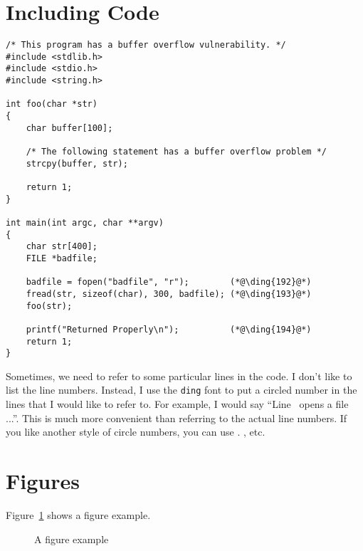\section{Including Code}



\begin{lstlisting}[caption={The vulnerable program (\texttt{stack.c})},
                   label={buffer:stack_program}]
/* This program has a buffer overflow vulnerability. */
#include <stdlib.h>
#include <stdio.h>
#include <string.h>

int foo(char *str)
{
    char buffer[100];

    /* The following statement has a buffer overflow problem */
    strcpy(buffer, str);

    return 1;
}

int main(int argc, char **argv)
{
    char str[400];
    FILE *badfile;

    badfile = fopen("badfile", "r");        (*@\ding{192}@*)
    fread(str, sizeof(char), 300, badfile); (*@\ding{193}@*)
    foo(str);

    printf("Returned Properly\n");          (*@\ding{194}@*)
    return 1;
}
\end{lstlisting}
 

Sometimes, we need to refer to some particular lines in the code. I don't like to list 
the line numbers. Instead, I use the \texttt{ding} font to 
put a circled number in the lines that I would like to refer to. 
For example, I would say ``Line~ opens a file ...''. 
This is much more convenient than referring to the actual line numbers. 
If you like another style of circle numbers, you can use
. , etc.




\section{Figures}

Figure~\ref{fig:example} shows a figure example. 

\begin{figure}[htb]
\begin{center}
\end{center}
\caption{A figure example}
\label{fig:example}
\end{figure}
 


